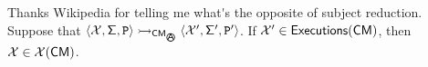 \begin{lemma}
\label{lem:subj.exp}
\ac{Thanks Wikipedia for telling me what's the opposite of subject reduction.}
Suppose that $\langle \aexec, \thdstackFun, \prog \rangle \absrightarrow_{\CM_{\anarchicsmall}} \langle \aexec', \thdstackFun', \prog' \rangle$. 
If $\mathcal{X}' \in {\mathsf{Executions}}(\mathsf{CM})$, then $\mathcal{X} \in \mathcal{X}(\mathsf{CM})$.
\end{lemma}


